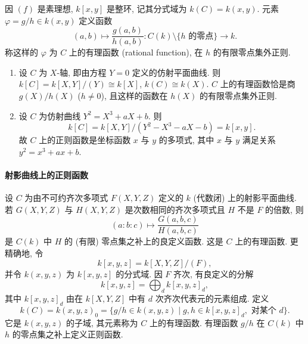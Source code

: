 因 $(f)$ 是素理想, $k[x,y]$ 是整环, 记其分式域为 $k(C) = k(x,y)$. 元素 $\varphi = g/h\in k(x,y)$ 定义函数
\[
(a,b)\mapsto\frac{g(a,b)}{h(a,b)}\colon C(k)\setminus\{\text{$h$ 的零点}\}\to k.
\]
称这样的 $\varphi$ 为 $C$ 上的有理函数 (rational function), 在 $h$ 的有限零点集外正则.

\begin{example} \label{thm:1.4.1} 
\begin{enumerate}[label=\textup{(\alph*)}]
\item 设 $C$ 为 $X$-轴, 即由方程 $Y = 0$ 定义的仿射平面曲线. 则 $k[C] = k[X,Y]/(Y)\cong k[X]$, $k(C)\cong k(X)$. $C$ 上的有理函数恰是商 $g(X)/h(X)$ ($h\neq 0$), 且这样的函数在 $h(X)$ 的有限零点集外正则.
\item 设 $C$ 为仿射曲线 $Y^2 = X^3 + aX + b$. 则
\[
k[C] = k[X,Y]/(Y^2 - X^3 - aX - b) = k[x,y].
\]
故 $C$ 上的正则函数是坐标函数 $x$ 与 $y$ 的多项式, 其中 $x$ 与 $y$ 满足关系 $y^2 = x^3 + ax + b$.
\end{enumerate}
\end{example}

\paragraph{射影曲线上的正则函数}
设 $C$ 为由不可约齐次多项式 $F(X,Y,Z)$ 定义的 $k$ (代数闭) 上的射影平面曲线. 若 $G(X,Y,Z)$ 与 $H(X,Y,Z)$ 是次数相同的齐次多项式且 $H$ 不是 $F$ 的倍数, 则
\[
(a:b:c)\mapsto\frac{G(a,b,c)}{H(a,b,c)}
\]
是 $C(k)$ 中 $H$ 的 (有限) 零点集之补上的良定义函数. 这是 $C$ 上的有理函数. 更精确地, 令
\[
k[x,y,z] = k[X,Y,Z]/(F),
\]
并令 $k(x,y,z)$ 为 $k[x,y,z]$ 的分式域. 因 $F$ 齐次, 有良定义的分解
\[
k[x,y,z] = \bigoplus_d k[x,y,z]_d,
\]
其中 $k[x,y,z]_d$ 由在 $k[X,Y,Z]$ 中有 $d$ 次齐次代表元的元素组成. 定义
\[
k(C) = k(x,y,z)_0 = \{g/h\in k(x,y,z) \mid g,h\in k[x,y,z]_d, \text{ 对某个 } d\}.
\]
它是 $k(x,y,z)$ 的子域, 其元素称为 $C$ 上的有理函数. 有理函数 $g/h$ 在 $C(k)$ 中 $h$ 的零点集之补上定义正则函数.

